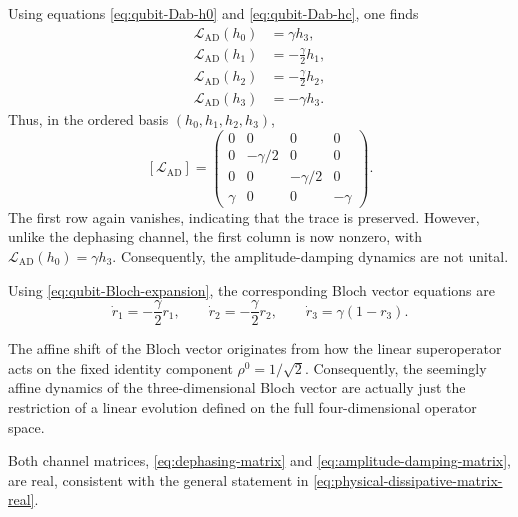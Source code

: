 \documentclass[notitlepage,aip,reprint,onecolumn]{revtex4-1}
\theoremstyle{definition}
\begin{document}
Using equations \eqref{eq:qubit-Dab-h0} and \eqref{eq:qubit-Dab-hc}, one finds \begin{subequations}\label{eq:amplitude-damping-basis-action}
\begin{align}
    \mathcal L_{\mathrm{AD}}(h_0)
    &=
    \gamma h_3,
    \\
    \mathcal L_{\mathrm{AD}}(h_1)
    &=
    -\frac{\gamma}{2}h_1,
    \\
    \mathcal L_{\mathrm{AD}}(h_2)
    &=
    -\frac{\gamma}{2}h_2,
    \\
    \mathcal L_{\mathrm{AD}}(h_3)
    &=
    -\gamma h_3.
\end{align}
\end{subequations}
Thus, in the ordered basis \((h_0,h_1,h_2,h_3)\),
\begin{equation}\label{eq:amplitude-damping-matrix}
    \left[
    \mathcal L_{\mathrm{AD}}
    \right]
    =
    \begin{pmatrix}
    0      & 0             & 0             & 0\\
    0      & -\gamma/2     & 0             & 0\\
    0      & 0             & -\gamma/2     & 0\\
    \gamma & 0             & 0             & -\gamma
    \end{pmatrix}.
\end{equation}
The first row again vanishes, indicating that the trace is preserved. However, unlike the dephasing channel, the first column is now nonzero, with \(\mathcal L_{\mathrm{AD}}(h_0) = \gamma h_3\). Consequently, the amplitude-damping dynamics are not unital.

Using \eqref{eq:qubit-Bloch-expansion}, the corresponding Bloch vector equations are
\begin{equation}\label{eq:amplitude-damping-Bloch-equations}
    \dot r_1
    =
    -\frac{\gamma}{2}r_1,
    \qquad
    \dot r_2
    =
    -\frac{\gamma}{2}r_2,
    \qquad
    \dot r_3
    =
    \gamma(1-r_3).
\end{equation}

The affine shift of the Bloch vector originates from how the linear superoperator acts on the fixed identity component \(\rho^0 = 1/\sqrt2\). Consequently, the seemingly affine dynamics of the three-dimensional Bloch vector are actually just the restriction of a linear evolution defined on the full four-dimensional operator space.

Both channel matrices, \eqref{eq:dephasing-matrix} and \eqref{eq:amplitude-damping-matrix}, are real, consistent with the general statement in \eqref{eq:physical-dissipative-matrix-real}.
\end{document}
